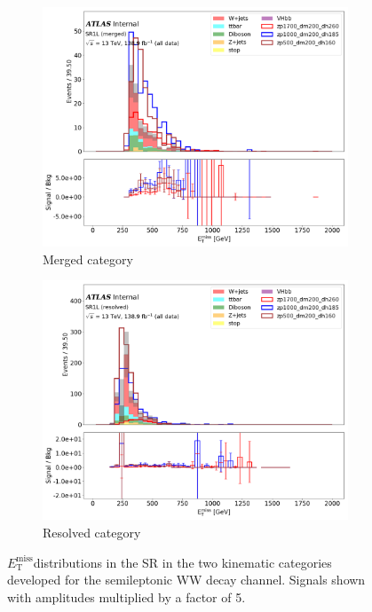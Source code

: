 \documentclass[12pt]{article}
\newcommand*{\met}{\ensuremath{E_\text{T}^\text{miss}}}
\begin{document}
\begin{figure}[H]
     \centering
     \begin{subfigure}[b]{0.49\textwidth}
         \centering
         \includegraphics[width=\textwidth]{figures/MetTST_met_merged.png}
         \caption[]{Merged category}
         \label{fig:merged}
     \end{subfigure}
     \hfill
     \begin{subfigure}[b]{0.49\textwidth}
         \centering
         \includegraphics[width=\textwidth]{figures/MetTST_met_resolved.png}
         \caption[]{Resolved category}
         \label{fig:resolved}
     \end{subfigure}
\caption[]{\met distributions in the SR in the two kinematic categories developed for the semileptonic WW decay channel. Signals shown with amplitudes multiplied by a factor of 5.}
\label{fig:lep_categories}
\end{figure}
\end{document}
